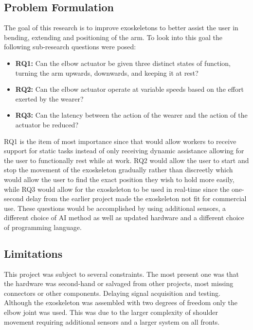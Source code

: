 \subsection{Problem Formulation}
The goal of this research is to improve exoskeletons to better assist the user in bending, extending and positioning of the arm.
To look into this goal the following sub-research questions were posed:
\begin{itemize}
        
    \item \textbf{RQ1:} Can the elbow actuator be given three distinct states of function, turning the arm upwards, downwards, and keeping it at rest?

    \item \textbf{RQ2:} Can the elbow actuator operate at variable speeds based on the effort exerted by the wearer?

    \item \textbf{RQ3:} Can the latency between the action of the wearer and the action of the actuator be reduced?

\end{itemize}
RQ1 is the item of most importance since that would allow workers to receive support for static tasks instead of only receiving dynamic
assistance allowing for the user to functionally rest while at work. RQ2 would allow the user to start and stop the
movement of the exoskeleton gradually rather than discreetly which would allow the user to find the exact position they
wish to hold more easily, while RQ3 would allow for the exoskeleton to be used in real-time since the one-second delay from the earlier project made the exoskeleton not fit for commercial use. 
These questions would be accomplished by using additional sensors, a different choice of AI method as well as updated hardware and a different
choice of programming language.\newline


\subsection{Limitations}
This project was subject to several constraints. 
The most present one was that the hardware was second-hand or salvaged from other projects, most missing connectors or other components.
Delaying signal acquisition and testing.
Although the exoskeleton was assembled with two degrees of freedom only the elbow joint was used.
This was due to the larger complexity of shoulder movement requiring additional sensors and a larger system on all
fronts.
